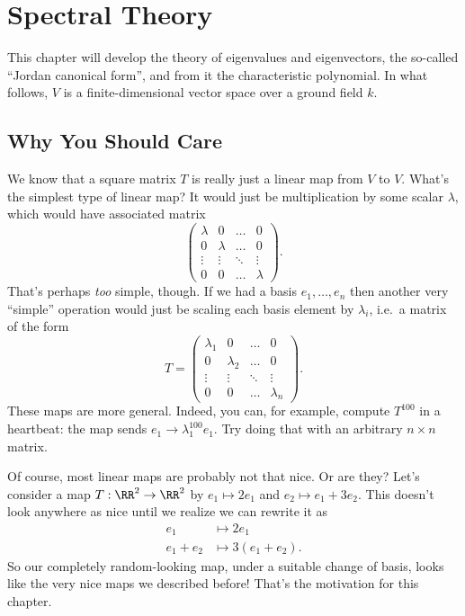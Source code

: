 \chapter{Spectral Theory}
This chapter will develop the theory of eigenvalues and eigenvectors, the so-called
``Jordan canonical form'', and from it the characteristic polynomial.
In what follows, $V$ is a finite-dimensional vector space over a ground field $k$.

\section{Why You Should Care}
We know that a square matrix $T$ is really just
a linear map from $V$ to $V$.
What's the simplest type of linear map?
It would just be multiplication by some scalar $\lambda$,
which would have associated matrix
\[
	\left(
	\begin{array}{cccc}
		\lambda & 0 & \dots & 0 \\
		0 & \lambda & \dots & 0 \\
		\vdots & \vdots & \ddots & \vdots \\
		0 & 0 & \dots & \lambda
	\end{array}
	\right).
\]
That's perhaps \emph{too} simple, though.
If we had a basis $e_1, \dots, e_n$ then another very ``simple'' operation
would just be scaling each basis element by $\lambda_i$,
i.e.\ a  matrix of the form
\[
	T = 
	\left(
	\begin{array}{cccc}
		\lambda_1 & 0 & \dots & 0 \\
		0 & \lambda_2 & \dots & 0 \\
		\vdots & \vdots & \ddots & \vdots \\
		0 & 0 & \dots & \lambda_n
	\end{array}
	\right).
\]
These maps are more general.
Indeed, you can, for example, compute $T^{100}$ in a heartbeat:
the map sends $e_1 \to \lambda_1^{100} e_1$.
Try doing that with an arbitrary $n \times n$ matrix.

Of course, most linear maps are probably not that nice.
Or are they?
Let's consider a map $T : \RR^2 \to \RR^2$
by $e_1 \mapsto 2e_1$ and $e_2 \mapsto e_1+3e_2$.
This doesn't look anywhere as nice until we realize we can rewrite it as
\begin{align*}
	e_1 &\mapsto 2e_1 \\ 
	e_1+e_2 &\mapsto 3(e_1+e_2).
\end{align*}
So our completely random-looking map, under a suitable change of basis,
looks like the very nice maps we described before!
That's the motivation for this chapter.

